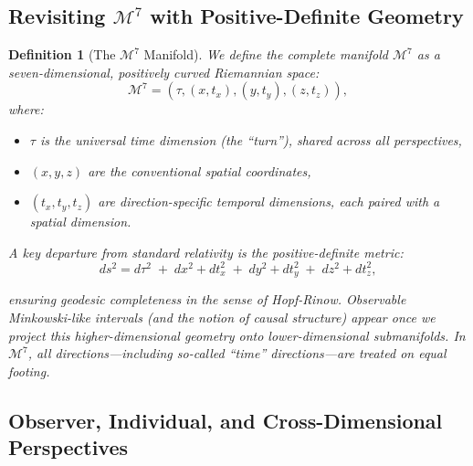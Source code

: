 \documentclass{article}
\newtheorem{definition}{Definition}
\begin{document}
\subsection*{Revisiting $\mathcal{M}^7$ with Positive-Definite Geometry}

\begin{definition}[The $\mathcal{M}^7$ Manifold]
We define the complete manifold $\mathcal{M}^7$ as a seven-dimensional, positively curved Riemannian space:
\begin{equation}
\mathcal{M}^7 = (\tau, (x, t_x), (y, t_y), (z, t_z)),
\end{equation}
where:
\begin{itemize}
  \item $\tau$ is the universal time dimension (the ``turn''), shared across all perspectives,
  \item $(x, y, z)$ are the conventional spatial coordinates,
  \item $(t_x, t_y, t_z)$ are direction-specific temporal dimensions, each paired with a spatial dimension.
\end{itemize}

A key departure from standard relativity is the \textit{positive-definite} metric:
\begin{equation}
\label{eq:M7_metric}
\displaystyle ds^2 = d\tau^2\; +\; dx^2 + dt_x^2\; +\; dy^2 + dt_y^2\; +\; dz^2 + dt_z^2,
\end{equation}

ensuring geodesic completeness in the sense of Hopf-Rinow. Observable Minkowski-like intervals (and the notion of causal structure) appear once we \emph{project} this higher-dimensional geometry onto lower-dimensional submanifolds. In $\mathcal{M}^7$, all directions---including so-called ``time'' directions---are treated on equal footing.
\end{definition}

\subsection*{Observer, Individual, and Cross-Dimensional Perspectives}
\end{document}

